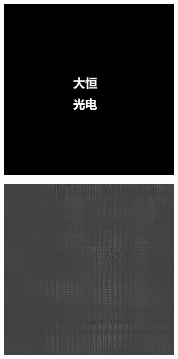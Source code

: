 \documentclass{ctexart}
\begin{document}
\begin{figure}[H]
  \centering
  \begin{subfigure}{.32\textwidth}
    \includegraphics[width=\linewidth]{数字全息实验数据/计算机模拟全息/全息样品图片/2-大恒光电.jpg}
  \end{subfigure}
  \begin{subfigure}{.32\textwidth}
    \includegraphics[width=\linewidth]{数字全息实验数据/计算机模拟全息/用软件模拟得到的全息图/2-大恒光电-全息图.jpg}

\end{subfigure}
\end{figure}
\end{document}
